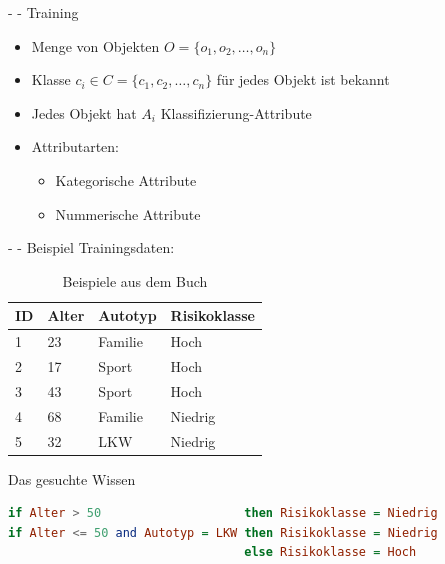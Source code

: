 \documentclass[fleqn,11pt,aspectratio=43]{beamer}
\begin{document}
\begin{frame}{\insertsectionhead - \insertsubsectionhead - Training \cite{ester2000knowledge}}
\begin{itemize}
\item Menge von Objekten $O = \{o_1, o_2, \ldots, o_n\}$
\item Klasse $c_i \in C = \{c_1, c_2, \ldots, c_n\}$ für jedes Objekt ist bekannt
\item Jedes Objekt hat $A_i$ Klassifizierung-Attribute
\item Attributarten:
\begin{itemize}
\item Kategorische Attribute
\item Nummerische Attribute
\end{itemize}
\end{itemize}
\end{frame}

\begin{frame}[fragile]{\insertsectionhead - \insertsubsectionhead - Beispiel \cite{ester2000knowledge}}
Trainingsdaten:
\begin{table}
\begin{tabular}{|p{2cm}|p{2cm}|p{2cm}|p{2cm}|}\hline
ID 	& Alter	& Autotyp	& Risikoklasse \\\hline \hline
1	& 23	& Familie	& Hoch\\
2	& 17	& Sport		& Hoch\\
3	& 43	& Sport		& Hoch\\
4	& 68	& Familie	& Niedrig\\
5	& 32	& LKW		& Niedrig \\\hline
\end{tabular}
\caption{Beispiele aus dem Buch \cite{ester2000knowledge}}
\end{table}
\pause
Das gesuchte Wissen
\begin{lstlisting}[language=Haskell]
if Alter > 50                    then Risikoklasse = Niedrig
if Alter <= 50 and Autotyp = LKW then Risikoklasse = Niedrig
                                 else Risikoklasse = Hoch
\end{lstlisting}
\end{frame}
\end{document}
